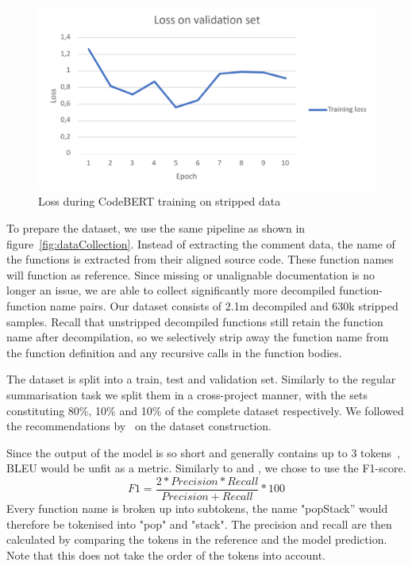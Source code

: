 \begin{figure}[h]
  \centering
  \includegraphics[width=\linewidth]{img/ExtremeLoss.png}
  \caption{Loss during CodeBERT training on stripped data}
  \label{fig:ExtremeLoss}
\end{figure}

To prepare the dataset, we use the same pipeline as shown in figure~\ref{fig:dataCollection}. Instead of extracting the comment data, the name of the functions is extracted from their aligned source code. These function names will function as reference. Since missing or unalignable documentation is no longer an issue, we are able to collect significantly more decompiled function-function name pairs. Our dataset consists of 2.1m decompiled and 630k stripped samples. Recall that unstripped decompiled functions still retain the function name after decompilation, so we selectively strip away the function name from the function definition and any recursive calls in the function bodies. 

The dataset is split into a train, test and validation set. Similarly to the regular summarisation task we split them in a cross-project manner, with the sets constituting 80\%, 10\% and 10\% of the complete dataset respectively. We followed the recommendations by~\citeauthor{recommend_summarization} on the dataset construction. 

Since the output of the model is so short and generally contains up to 3 tokens~\cite{ExtremeSummarization}, BLEU would be unfit as a metric. Similarly to \citeauthor{ExtremeSummarization} and \citeauthor{PolyglotCodeBERT}, we chose to use the F1-score.
\[\mathit{F1} = \frac{2*\mathit{Precision}*\mathit{Recall}}{\mathit{Precision}+\mathit{Recall}} * 100\] 
Every function name is broken up into subtokens, the name "popStack'' would therefore be tokenised into "pop" and "stack". The precision and recall are then calculated by comparing the tokens in the reference and the model prediction. Note that this does not take the order of the tokens into account.

